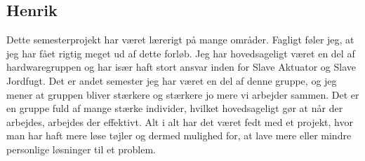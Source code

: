 \subsection{Henrik}
Dette semesterprojekt har været lærerigt på mange områder. Fagligt føler jeg, at jeg har fået rigtig meget ud af dette forløb. Jeg har hovedsageligt været en del af hardwaregruppen og har især haft stort ansvar inden for Slave Aktuator og Slave Jordfugt. 
Det er andet semester jeg har været en del af denne gruppe, og jeg mener at gruppen bliver stærkere og stærkere jo mere vi arbejder sammen. Det er en gruppe fuld af mange stærke individer, hvilket hovedsageligt gør at når der arbejdes, arbejdes der effektivt.
Alt i alt har det været fedt med et projekt, hvor man har haft mere løse tøjler og dermed mulighed for, at lave mere eller mindre personlige løsninger til et problem.